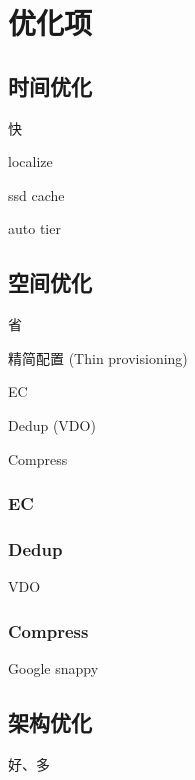 \chapter{优化项}

\section{时间优化}

快

\begin{enumbox}
\item localize
\item ssd cache
\item auto tier
\end{enumbox}

\section{空间优化}

省

\begin{enumbox}
\item 精简配置 (Thin provisioning)
\item EC
\item Dedup (VDO)
\item Compress
\end{enumbox}

\subsection{EC}

\subsection{Dedup}

VDO

\subsection{Compress}

Google snappy

\section{架构优化}

好、多

